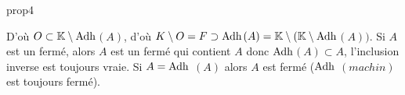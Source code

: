\documentclass[12pt,a4paper]{report}
\begin{document}
\begin{demonstration}{prop4}
\begin{enumerate}
\newline D'où $O \subset \mathbb{K} \setminus \rm{Adh}$$(A)$, d'où $K \setminus O = F \supset \rm{Adh}$$(A) = \mathbb{K} \setminus (\mathbb{K} \setminus \rm{Adh}$$(A))$.
\newline \newline Si $A$ est un fermé, alors $A$ est un fermé qui contient $A$ donc $\rm{Adh}$$(A) \subset A$, l'inclusion inverse est toujours vraie.
\newline Si $A = \rm{Adh}$ $(A)$ alors $A$ est fermé ($\rm{Adh}$ $(machin)$ est toujours fermé).
\end{enumerate}
\end{demonstration}
\end{document}
